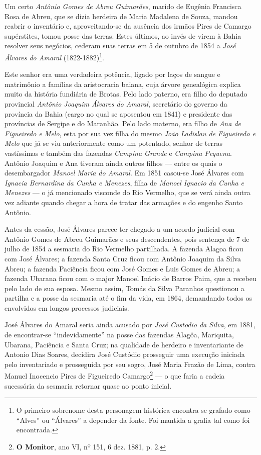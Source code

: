 Um certo \textit{Antônio Gomes de Abreu Guimarães}, marido de Eugênia Francisca Rosa de Abreu, que se dizia herdeira de Maria Madalena de Souza, mandou reabrir o inventário e, aproveitando-se da ausência dos irmãos Pires de Camargo supérstites, tomou posse das terras. Estes últimos, ao invés de virem à Bahia resolver seus negócios, cederam suas terras em 5 de outubro de 1854 a \textit{José Álvares do Amaral} (1822-1882)\footnote{O primeiro sobrenome desta personagem histórica encontra-se grafado como ``Alves'' ou ``Álvares'' a depender da fonte. Foi mantida a grafia tal como foi encontrada.}.

Este senhor era uma verdadeira potência, ligado por laços de sangue e matrimônio a famílias da aristocracia baiana, cuja árvore genealógica explica muito da história fundiária de Brotas. Pelo lado paterno, era filho do deputado provincial \textit{Antônio Joaquim Álvares do Amaral}, secretário do governo da província da Bahia (cargo no qual se aposentou em 1841) e presidente das províncias de Sergipe e do Maranhão. Pelo lado materno, era filho de \textit{Ana de Figueiredo e Melo}, esta por sua vez filha do mesmo \textit{João Ladislau de Figueiredo e Melo} que já se viu anteriormente como um potentado, senhor de terras vastíssimas e também das fazendas \textit{Campina Grande} e \textit{Campina Pequena}. Antônio Joaquim e Ana tiveram ainda outros filhos --- entre os quais o desembargador \textit{Manoel Maria do Amaral}. Em 1851 casou-se José Álvares com \textit{Ignacia Bernardina da Cunha e Menezes}, filha de \textit{Manoel Ignacio da Cunha e Menezes} --- o já mencionado visconde do Rio Vermelho, que se verá ainda outra vez adiante quando chegar a hora de tratar das armações e do engenho Santo Antônio. 

Antes da cessão, José Álvares parece ter chegado a um acordo judicial com Antônio Gomes de Abreu Guimarães e seus descendentes, pois sentença de 7 de julho de 1854 a sesmaria do Rio Vermelho partilhada. A fazenda Alagoa ficou com José Álvares; a fazenda Santa Cruz ficou com Antônio Joaquim da Silva Abreu; a fazenda Paciência ficou com José Gomes e Luis Gomes de Abreu; a fazenda Ubarana ficou com o major Manoel Inácio de Barros Paim, que a recebeu pelo lado de sua esposa. Mesmo assim, Tomás da Silva Paranhos questionou a partilha e a posse da sesmaria até o fim da vida, em 1864, demandando todos os envolvidos em longos processos judiciais.

José Álvares do Amaral seria ainda acusado por \textit{José Custodio da Silva}, em 1881, de encontrar-se ``indevidamente'' na posse das fazendas Alagôa, Mariquita, Ubarana, Paciência e Santa Cruz; na qualidade de herdeiro e inventariante de Antonio Dias Soares, decidira José Custódio prosseguir uma execução iniciada pelo inventariado e prosseguida por seu sogro, José Maria Frazão de Lima, contra Manuel Inocencio Pires de Figueiredo Camargo\footnote{\textbf{O Monitor}, ano VI, nº 151, 6 dez. 1881, p. 2.} --- o que faria a cadeia sucessória da sesmaria retornar quase ao ponto inicial.

